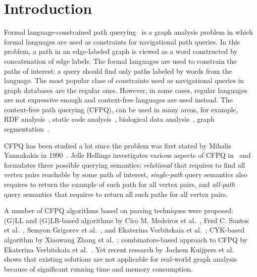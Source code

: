\section{Introduction}

Formal language-constrained path querying~\cite{doi:10.1137/S0097539798337716} is a graph analysis problem in which formal languages are used as constraints for
navigational path queries. In this problem, a path in an edge-labeled graph is viewed
as a word constructed by concatenation of edge labels. The formal languages are used to constrain the paths of interest: a query should find only paths labeled by words from the language. The most popular class of constraints used as navigational queries in graph databases are the regular ones.
However, in some cases, regular languages are not expressive enough and context-free languages are used instead. The context-free path querying (CFPQ), can be used in many areas, for example, RDF analysis~\cite{10.1007/978-3-319-46523-4_38}, static code analysis~\cite{Zheng,10.1145/373243.360208}, biological data analysis~\cite{SubgraphQueriesbyContextfreeGrammars}, graph segmentation~\cite{8731467}.

CFPQ has been studied a lot since the problem was first stated by Mihalis Yannakakis in 1990~\cite{Yannakakis}.
Jelle Hellings investigates various aspects of CFPQ in~\cite{hellingsPathQuerying,hellingsRelational,DBLP:journals/corr/Hellings15} and formulates three possible querying semantics: \textit{relational} that requires to find all vertex pairs reachable by some path of interest, \textit{single-path} query semantics also requires to return the example of such path for all vertex pairs, and \textit{all-path} query semantics that requires to return all such paths for all vertex pairs.

A number of CFPQ algorithms based on parsing techniques were proposed: (G)LL and (G)LR-based algorithms by Ciro M. Medeiros et al.~\cite{Medeiros:2018:EEC:3167132.3167265}, Fred C. Santos et al.~\cite{10.1007/978-3-319-91662-0_17}, Semyon Grigorev et al.~\cite{Grigorev:2017:CPQ:3166094.3166104}, and Ekaterina Verbitskaia et al.~\cite{10.1007/978-3-319-41579-6_22}; CYK-based algorithm by Xiaowang Zhang et al.~\cite{10.1007/978-3-319-46523-4_38}; combinators-based approach to CFPQ by Ekaterina Verbitskaia et al.~\cite{Verbitskaia:2018:PCC:3241653.3241655}.
Yet recent research by Jochem Kuijpers et al.~\cite{Kuijpers:2019:ESC:3335783.3335791} shows that existing solutions are not applicable for real-world graph analysis because of significant
running time and memory consumption.

